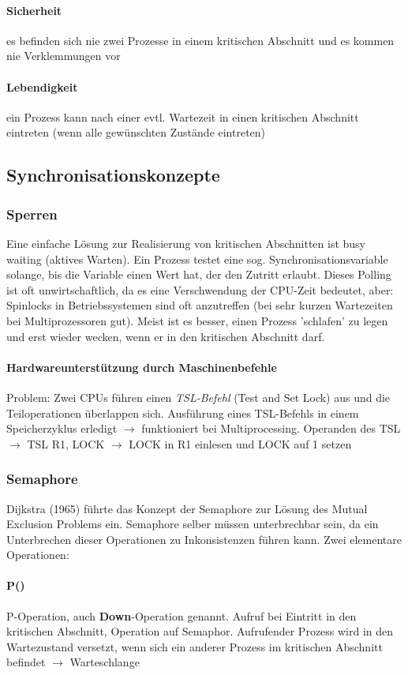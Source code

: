 \documentclass[11pt,a4paper,landscape]{article}
\begin{document}
\begin{multicols*}{3}
	\paragraph{Sicherheit} es befinden sich nie zwei Prozesse in einem kritischen Abschnitt und es kommen nie Verklemmungen vor
	\paragraph{Lebendigkeit} ein Prozess kann nach einer evtl. Wartezeit in einen kritischen Abschnitt eintreten (wenn alle gewünschten Zustände eintreten)
	\subsection{Synchronisationskonzepte}
	\subsubsection{Sperren}
	Eine einfache Lösung zur Realisierung von kritischen Abschnitten ist busy waiting (aktives Warten). Ein Prozess testet eine sog. Synchronisationsvariable solange, bis die Variable einen Wert hat, der den Zutritt erlaubt. Dieses Polling ist oft unwirtschaftlich, da es eine Verschwendung der CPU-Zeit bedeutet, aber: Spinlocks in Betriebssystemen sind oft anzutreffen (bei sehr kurzen Wartezeiten bei Multiprozessoren gut). Meist ist es besser, einen Prozess 'schlafen' zu legen und erst wieder wecken, wenn er in den kritischen Abschnitt darf.
	\paragraph{Hardwareunterstützung durch Maschinenbefehle} Problem: Zwei CPUs führen einen \textit{TSL-Befehl} (Test and Set Lock) aus und die Teiloperationen überlappen sich. Ausführung eines TSL-Befehls in einem Speicherzyklus erledigt $\rightarrow$ funktioniert bei Multiprocessing. Operanden des TSL $\rightarrow$ TSL R1, LOCK $\rightarrow$ LOCK in R1 einlesen und LOCK auf 1 setzen
	\subsubsection{Semaphore}
	Dijkstra (1965) führte das Konzept der Semaphore zur Lösung des Mutual Exclusion Problems ein. Semaphore selber müssen unterbrechbar sein, da ein Unterbrechen dieser Operationen zu Inkonsistenzen führen kann. Zwei elementare Operationen:
	\paragraph{P()} P-Operation, auch \textbf{Down}-Operation genannt. Aufruf bei Eintritt in den kritischen Abschnitt, Operation auf Semaphor. Aufrufender Prozess wird in den Wartezustand versetzt, wenn sich ein anderer Prozess im kritischen Abschnitt befindet $\rightarrow$ Warteschlange

\end{multicols*}
\end{document}
